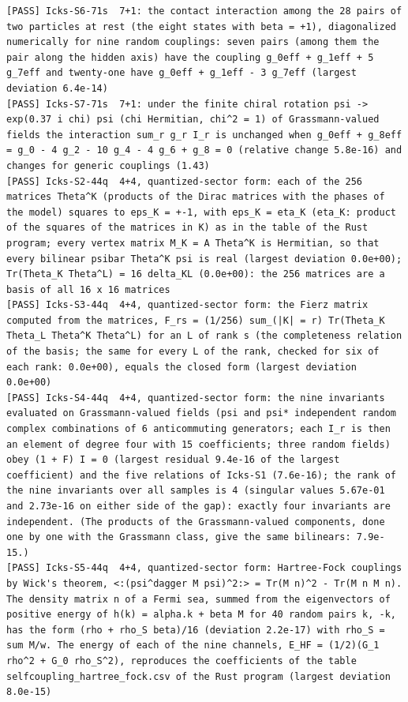 \documentclass[
  10pt,
]{article}
\begin{document}
\begin{verbatim}
[PASS] Icks-S6-71s  7+1: the contact interaction among the 28 pairs of two particles at rest (the eight states with beta = +1), diagonalized numerically for nine random couplings: seven pairs (among them the pair along the hidden axis) have the coupling g_0eff + g_1eff + 5 g_7eff and twenty-one have g_0eff + g_1eff - 3 g_7eff (largest deviation 6.4e-14)
[PASS] Icks-S7-71s  7+1: under the finite chiral rotation psi -> exp(0.37 i chi) psi (chi Hermitian, chi^2 = 1) of Grassmann-valued fields the interaction sum_r g_r I_r is unchanged when g_0eff + g_8eff = g_0 - 4 g_2 - 10 g_4 - 4 g_6 + g_8 = 0 (relative change 5.8e-16) and changes for generic couplings (1.43)
[PASS] Icks-S2-44q  4+4, quantized-sector form: each of the 256 matrices Theta^K (products of the Dirac matrices with the phases of the model) squares to eps_K = +-1, with eps_K = eta_K (eta_K: product of the squares of the matrices in K) as in the table of the Rust program; every vertex matrix M_K = A Theta^K is Hermitian, so that every bilinear psibar Theta^K psi is real (largest deviation 0.0e+00); Tr(Theta_K Theta^L) = 16 delta_KL (0.0e+00): the 256 matrices are a basis of all 16 x 16 matrices
[PASS] Icks-S3-44q  4+4, quantized-sector form: the Fierz matrix computed from the matrices, F_rs = (1/256) sum_(|K| = r) Tr(Theta_K Theta_L Theta^K Theta^L) for an L of rank s (the completeness relation of the basis; the same for every L of the rank, checked for six of each rank: 0.0e+00), equals the closed form (largest deviation 0.0e+00)
[PASS] Icks-S4-44q  4+4, quantized-sector form: the nine invariants evaluated on Grassmann-valued fields (psi and psi* independent random complex combinations of 6 anticommuting generators; each I_r is then an element of degree four with 15 coefficients; three random fields) obey (1 + F) I = 0 (largest residual 9.4e-16 of the largest coefficient) and the five relations of Icks-S1 (7.6e-16); the rank of the nine invariants over all samples is 4 (singular values 5.67e-01 and 2.73e-16 on either side of the gap): exactly four invariants are independent. (The products of the Grassmann-valued components, done one by one with the Grassmann class, give the same bilinears: 7.9e-15.)
[PASS] Icks-S5-44q  4+4, quantized-sector form: Hartree-Fock couplings by Wick's theorem, <:(psi^dagger M psi)^2:> = Tr(M n)^2 - Tr(M n M n). The density matrix n of a Fermi sea, summed from the eigenvectors of positive energy of h(k) = alpha.k + beta M for 40 random pairs k, -k, has the form (rho + rho_S beta)/16 (deviation 2.2e-17) with rho_S = sum M/w. The energy of each of the nine channels, E_HF = (1/2)(G_1 rho^2 + G_0 rho_S^2), reproduces the coefficients of the table selfcoupling_hartree_fock.csv of the Rust program (largest deviation 8.0e-15)

\end{verbatim}
\end{document}
